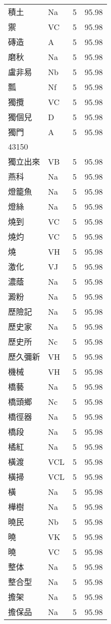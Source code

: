 \documentclass[twocolumn]{book}
\begin{document}
\begin{supertabular}{llrr}
積土 & Na & 5 &  95.98\\
禦 & VC & 5 &  95.98\\
磚造 & A & 5 &  95.98\\
磨秋 & Na & 5 &  95.98\\
盧非易 & Nb & 5 &  95.98\\
瓢 & Nf & 5 &  95.98\\
獨攬 & VC & 5 &  95.98\\
獨個兒 & D & 5 &  95.98\\
獨門 & A & 5 &  95.98\\
43150\\
獨立出來 & VB & 5 &  95.98\\
燕科 & Na & 5 &  95.98\\
燈籠魚 & Na & 5 &  95.98\\
燈絲 & Na & 5 &  95.98\\
燒到 & VC & 5 &  95.98\\
燒灼 & VC & 5 &  95.98\\
燒 & VH & 5 &  95.98\\
激化 & VJ & 5 &  95.98\\
濃蔭 & Na & 5 &  95.98\\
澱粉 & Na & 5 &  95.98\\
歷險記 & Na & 5 &  95.98\\
歷史家 & Na & 5 &  95.98\\
歷史所 & Nc & 5 &  95.98\\
歷久彌新 & VH & 5 &  95.98\\
機械 & VH & 5 &  95.98\\
橋藝 & Na & 5 &  95.98\\
橋頭鄉 & Nc & 5 &  95.98\\
橋徑器 & Na & 5 &  95.98\\
橋段 & Na & 5 &  95.98\\
橘紅 & Na & 5 &  95.98\\
橫渡 & VCL & 5 &  95.98\\
橫掃 & VCL & 5 &  95.98\\
橫 & Na & 5 &  95.98\\
樺樹 & Na & 5 &  95.98\\
曉民 & Nb & 5 &  95.98\\
曉 & VK & 5 &  95.98\\
曉 & VC & 5 &  95.98\\
整体 & Na & 5 &  95.98\\
整合型 & Na & 5 &  95.98\\
擔架 & Na & 5 &  95.98\\
擔保品 & Na & 5 &  95.98\\

\end{supertabular}
\end{document}
